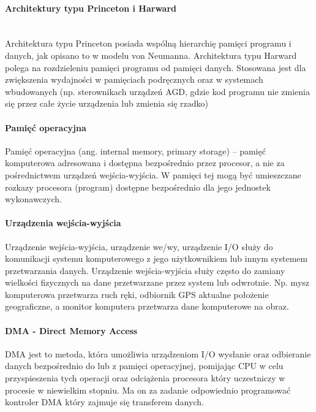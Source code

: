 \documentclass[a4paper,twoside]{report}
\begin{document}
\medskip 
\paragraph{Architektury typu Princeton i Harward \\\\}


Architektura typu Princeton posiada wspólną hierarchię pamięci programu i danych, jak opisano to w modelu von
Neumanna. Architektura typu Harward polega na rozdzieleniu pamięci programu od pamięci danych. Stosowana
jest dla zwiększenia wydajności w pamięciach podręcznych oraz w systemach wbudowanych (np. sterownikach
urządzeń AGD, gdzie kod programu nie zmienia się przez całe życie urządzenia lub zmienia się rzadko)

\paragraph{Pamięć operacyjna}

Pamięć operacyjna (ang. internal memory, primary storage) – pamięć komputerowa adresowana i dostępna bezpośrednio przez procesor, a nie za pośrednictwem urządzeń wejścia-wyjścia. W pamięci tej mogą być umieszczane rozkazy procesora (program) dostępne bezpośrednio dla jego jednostek wykonawczych.

\paragraph{Urządzenia wejścia-wyjścia} 

Urządzenie wejścia-wyjścia, urządzenie we/wy, urządzenie I/O służy do komunikacji systemu komputerowego z jego użytkownikiem lub innym systemem przetwarzania danych. Urządzenie wejścia-wyjścia służy często do zamiany wielkości fizycznych na dane przetwarzane przez system lub odwrotnie. Np. mysz komputerowa przetwarza ruch ręki, odbiornik GPS aktualne położenie geograficzne, a monitor komputera przetwarza dane komputerowe na obraz.

\paragraph{DMA - Direct Memory Access}

DMA jest to metoda, która umożliwia urządzeniom I/O wysłanie oraz odbieranie danych bezpośrednio do lub z pamięci operacyjnej, pomijając CPU w celu przyspieszenia tych operacji oraz odciążenia procesora który uczestniczy w procesie w niewielkim stopniu. Ma on za zadanie odpowiednio programować kontroler DMA który zajmuje się transferem danych. 
\end{document}
